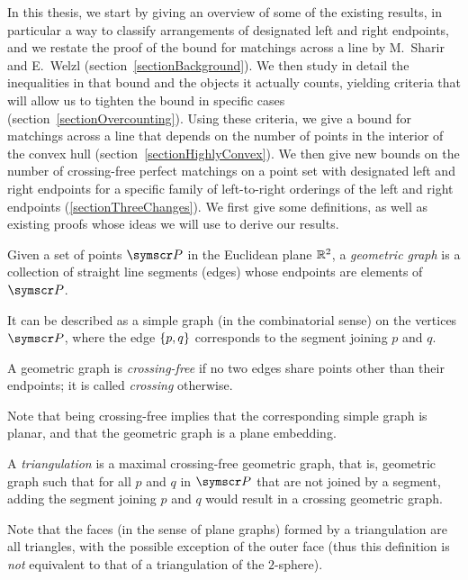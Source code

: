 In this thesis, 
we start by giving an overview of some of the existing results, in particular a way
to classify arrangements of designated left and right endpoints,
and we restate the proof of the bound for matchings across a line by M.~Sharir and E.~Welzl
(section~\ref{sectionBackground}).
We then study in detail the inequalities in that bound and the objects it actually counts,
yielding criteria that will allow us to tighten the bound in specific cases (section~\ref{sectionOvercounting}).
Using these criteria, we give a bound for
matchings across a line that depends on the number of points in the interior of the convex hull
(section~\ref{sectionHighlyConvex}).
We then give new bounds on the number of crossing-free perfect matchings on a point set with designated left and
right endpoints for a specific family of left-to-right orderings of the left and right endpoints
(\ref{sectionThreeChanges}). 
\label{sectionBackground}
We first give some definitions, as well as existing proofs whose ideas we will use to derive our results.
\begin{definition}
Given a set of points $\pointset P$ in the Euclidean plane $\mathbb{R}^2$,
a \emph{geometric graph} is a collection of straight line segments (edges)
whose endpoints are elements of $\pointset P$.

It can be described as a simple graph (in the combinatorial sense)
on the vertices $\pointset P$, where the edge $\left\lbrace p,q\right\rbrace$ corresponds to the segment joining
$p$ and $q$.
\end{definition}
\begin{definition}
A geometric graph is \emph{crossing-free} if no two edges share points other than
their endpoints; it is called \emph{crossing} otherwise.
\end{definition}
Note that being crossing-free implies that the corresponding simple graph is planar, and that the
geometric graph is a plane embedding.
\begin{sloppypar}
\begin{definition}[triangulation]
A \emph{triangulation} is a maximal crossing-free geometric graph, that is,
geometric graph such that for all $p$ and $q$ in $\pointset P$ that are not joined by a
segment, adding the segment joining $p$ and $q$ would result in a crossing
geometric graph.
\end{definition}
Note that the faces (in the sense of plane graphs) formed by a triangulation are
all triangles, with the possible exception of the outer face (thus this definition
is \emph{not} equivalent to that of a triangulation of the $2$-sphere).
\end{sloppypar}

